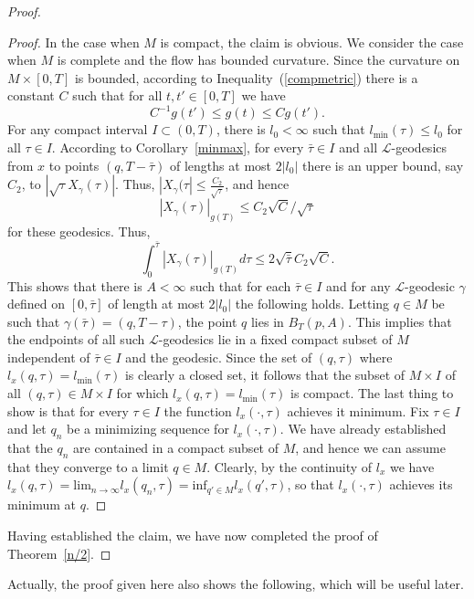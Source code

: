 \begin{proof}
\begin{proof}
In the case when $M$ is compact, the claim is obvious. We consider
the case when $M$ is complete and the flow has bounded curvature.
Since the curvature on $M\times [0,T]$ is bounded, according to
Inequality~(\ref{compmetric}) there is a constant $C$ such that for
all $t,t'\in [0,T]$ we have
$$C^{-1}g(t')\le g(t)\le Cg(t').$$
For any compact interval $I\subset (0,T)$, there is $l_0<\infty$
such that $l_\mathrm{min}(\tau)\le l_0$ for all $\tau\in I$. According
to Corollary~\ref{minmax}, for every $\bar\tau\in I$ and all
${\mathcal L}$-geodesics from $x$ to points $(q,T-\bar\tau)$ of
lengths at most $2|l_0|$ there is an upper bound, say $C_2$, to
$|\sqrt{\tau}X_\gamma(\tau)|$. Thus, $|X_\gamma(\tau|\le
\frac{C_2}{\sqrt{\tau}}$, and hence
$$|X_\gamma(\tau)|_{g(T)}\le C_2\sqrt{C}/\sqrt{\tau}$$
 for these geodesics.
Thus, $$\int_0^{\bar\tau}|X_\gamma(\tau)|_{g(T)}d\tau\le
2\sqrt{\bar\tau}C_2\sqrt{C}.$$ This shows that there is $A<\infty$
such that for each $\bar\tau\in I$ and for any ${\mathcal
L}$-geodesic $\gamma$ defined on $[0,\bar\tau]$ of length at most
$2|l_0|$ the following holds. Letting $q\in M$ be such that
$\gamma(\bar\tau)=(q,T-\tau)$, the point $q$ lies in $B_T(p,A)$.
This implies  that  the endpoints of all such ${\mathcal
L}$-geodesics lie in a fixed compact subset of $M$ independent of
$\bar\tau\in I$ and the geodesic. Since the set of $(q,\tau)$ where
$l_x(q,\tau)=l_\mathrm{min}(\tau)$ is clearly a closed set, it follows
that the subset of $M\times I$ of all $(q,\tau)\in M\times I$ for
which $l_x(q,\tau)=l_\mathrm{min}(\tau)$ is compact. The last thing to
show is that for every $\tau\in I$ the function $l_x(\cdot,\tau)$
achieves it minimum. Fix $\tau\in I$ and let $q_n$ be a minimizing
sequence for $l_x(\cdot,\tau)$. We have already established that the
$q_n$ are contained in a compact subset of $M$, and hence we can
assume that they converge to a limit $q\in M$. Clearly, by the
continuity of $l_x$ we have $l_x(q,\tau)=\mathrm{lim}_{n\rightarrow
\infty}l_x(q_n,\tau)=\mathrm{inf}_{q'\in M}l_x(q',\tau)$, so that
$l_x(\cdot,\tau)$ achieves its minimum at $q$.
\end{proof}

Having established the claim, we have now completed the proof of
Theorem~\ref{n/2}.
\end{proof}

Actually, the proof given here also shows the following, which will
be useful later.

